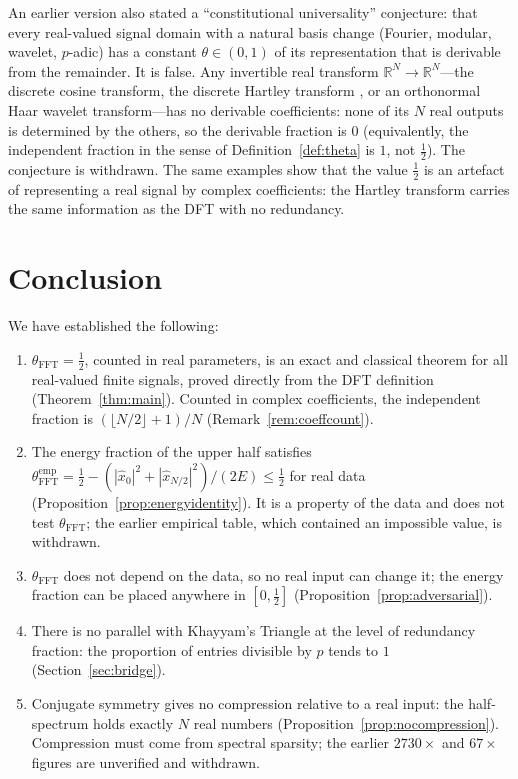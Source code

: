 \documentclass[12pt]{article}
\theoremstyle{definition}
\newcommand{\R}{\mathbb{R}}
\newcommand{\abs}[1]{\left|#1\right|}
\newcommand{\thetaFFT}{\theta_{\mathrm{FFT}}}
\begin{document}
An earlier version also stated a ``constitutional universality''
conjecture: that every real-valued signal domain with a natural basis
change (Fourier, modular, wavelet, $p$-adic) has a constant
$\theta \in (0,1)$ of its representation that is derivable from the
remainder.  It is false.  Any invertible real transform
$\R^N \to \R^N$---the discrete cosine transform, the discrete Hartley
transform \cite{Bracewell1983}, or an orthonormal Haar wavelet
transform---has no derivable coefficients: none of its $N$ real outputs
is determined by the others, so the derivable fraction is $0$ (equivalently,
the independent fraction in the sense of Definition~\ref{def:theta} is $1$, not
$\tfrac{1}{2}$).  The conjecture is withdrawn.  The same examples show that the value
$\tfrac{1}{2}$ is an artefact of representing a real signal by complex
coefficients: the Hartley transform carries the same information as the
DFT with no redundancy.

\section{Conclusion}

We have established the following:

\begin{enumerate}[noitemsep]
  \item $\thetaFFT = \tfrac{1}{2}$, counted in real parameters, is an
        exact and classical theorem for all real-valued finite signals,
        proved directly from the DFT definition (Theorem~\ref{thm:main}).
        Counted in complex coefficients, the independent fraction is
        $(\lfloor N/2 \rfloor + 1)/N$ (Remark~\ref{rem:coeffcount}).
  \item The energy fraction of the upper half satisfies
        $\thetaFFT^{\mathrm{emp}} = \tfrac{1}{2} -
        (\abs{\hat{x}_0}^2 + \abs{\hat{x}_{N/2}}^2)/(2E) \leq \tfrac{1}{2}$
        for real data (Proposition~\ref{prop:energyidentity}).  It is a
        property of the data and does not test $\thetaFFT$; the earlier
        empirical table, which contained an impossible value, is
        withdrawn.
  \item $\thetaFFT$ does not depend on the data, so no real input can
        change it; the energy fraction can be placed anywhere in
        $[0, \tfrac{1}{2}]$ (Proposition~\ref{prop:adversarial}).
  \item There is no parallel with Khayyam's Triangle at the level of
        redundancy fraction: the proportion of entries divisible by $p$
        tends to $1$ (Section~\ref{sec:bridge}).
  \item Conjugate symmetry gives no compression relative to a real
        input: the half-spectrum holds exactly $N$ real numbers
        (Proposition~\ref{prop:nocompression}).  Compression must come
        from spectral sparsity; the earlier $2730\times$ and $67\times$
        figures are unverified and withdrawn.
\end{enumerate}
\end{document}
